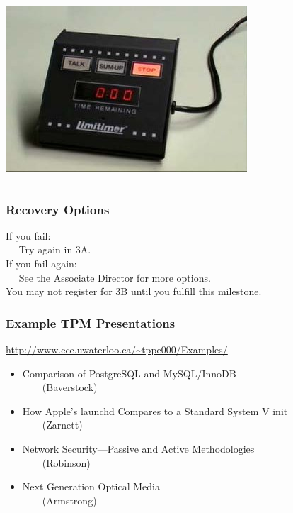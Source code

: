 \documentclass{beamer}
\begin{document}
\begin{frame}
\begin{columns}[c]
\includegraphics[width=\columnwidth]{stop}
\end{columns}

\end{frame}

\begin{frame}

\frametitle{Recovery Options}

If you fail: \\
$\quad$ Try again in 3A.\\[2em]

If you fail again:\\
$\quad$ See the Associate Director for more options.\\[2em]

You may not register for 3B until you fulfill this milestone.

\end{frame}

\begin{frame}

\frametitle{Example TPM Presentations}

\url{http://www.ece.uwaterloo.ca/~tppe000/Examples/}

\small
\begin{itemize}
\item Comparison of PostgreSQL and MySQL/InnoDB\\
$\qquad$(Baverstock)
\item How Apple's launchd Compares to a Standard System V init\\
$\qquad$(Zarnett)
\item Network Security---Passive and Active Methodologies\\
$\qquad$(Robinson)
\item Next Generation Optical Media\\
$\qquad$(Armstrong)
\end{itemize}



\end{frame}
\end{document}
